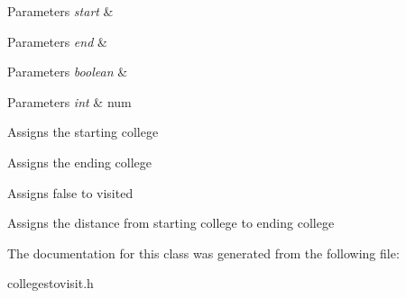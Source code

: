 \begin{DoxyItemize}
\item 
\begin{DoxyParams}{Parameters}
{\em start} & \\
\hline
\end{DoxyParams}

\item 
\begin{DoxyParams}{Parameters}
{\em end} & \\
\hline
\end{DoxyParams}

\item 
\begin{DoxyParams}{Parameters}
{\em boolean} & \\
\hline
\end{DoxyParams}

\item 
\begin{DoxyParams}{Parameters}
{\em int} & num \\
\hline
\end{DoxyParams}

\end{DoxyItemize}Assigns the starting college

Assigns the ending college

Assigns false to visited

Assigns the distance from starting college to ending college 

The documentation for this class was generated from the following file\+:\begin{DoxyCompactItemize}
\item 
collegestovisit.\+h\end{DoxyCompactItemize}
